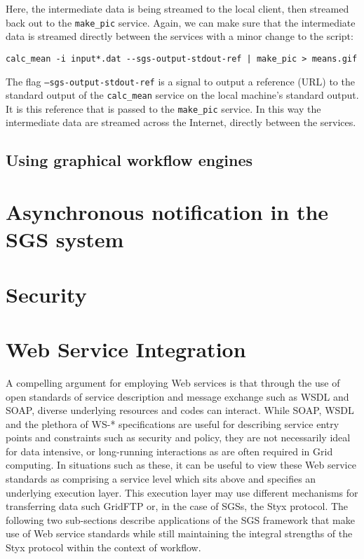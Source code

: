 \documentclass{llncs}
\begin{document}
Here, the intermediate data is being streamed to the local client, then streamed back out to the {\tt make\_pic} service.  Again, we can make sure that the intermediate data is streamed directly between the services with a minor change to the script:

\begin{verbatim}
calc_mean -i input*.dat --sgs-output-stdout-ref | make_pic > means.gif
\end{verbatim}

The flag {\tt --sgs-output-stdout-ref} is a signal to output a reference (URL) to the standard output of the {\tt calc\_mean} service on the local machine's standard output.  It is this reference that is passed to the {\tt make\_pic} service.  In this way the intermediate data are streamed across the Internet, directly between the services.
%
\subsection{Using graphical workflow engines}

%
\section{Asynchronous notification in the SGS system}
%
\section{Security}
%

\section{Web Service Integration}
\label{sec:webservices}

A compelling argument for employing Web services is that through the use of open standards of service description and message exchange such as WSDL and SOAP, diverse underlying resources and codes can interact. While SOAP, WSDL and the plethora of WS-* specifications are useful for describing service entry points and constraints such as security and policy, they are not necessarily ideal for data intensive, or long-running interactions as are often required in Grid computing. In situations such as these, it can be useful to view these Web service standards as comprising a service level which sits above and specifies an underlying execution layer. This execution layer may use different mechanisms for transferring data such GridFTP or, in the case of SGSs, the Styx protocol. The following two sub-sections describe applications of the SGS framework that make use of Web service standards while still maintaining the integral strengths of the Styx protocol within the context of workflow.
\end{document}
